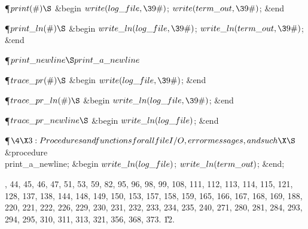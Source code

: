 \Y\P\D {}$\\{print}(\#)\S$\1\6
\&{begin} $\\{write}(\\{log\_file},\39\#)$;\5
$\\{write}(\\{term\_out},\39\#)$;\6
\&{end}\2\par
\P\D {}$\\{print\_ln}(\#)\S$\1\6
\&{begin} $\\{write\_ln}(\\{log\_file},\39\#)$;\5
$\\{write\_ln}(\\{term\_out},\39\#)$;\6
\&{end}\2\par
\P\D {}$\\{print\_newline}\S\\{print\_a\_newline}$\Y\par
\P\D {}$\\{trace\_pr}(\#)\S$\1\6
\&{begin} $\\{write}(\\{log\_file},\39\#)$;\6
\&{end}\2\par
\P\D {}$\\{trace\_pr\_ln}(\#)\S$\1\6
\&{begin} $\\{write\_ln}(\\{log\_file},\39\#)$;\6
\&{end}\2\par
\P\D {}$\\{trace\_pr\_newline}\S$\1\6
\&{begin} $\\{write\_ln}(\\{log\_file})$;\6
\&{end}\2\par
\Y\P$\4\X3:Procedures and functions for all file I/O, error messages, and such%
\X\S$\6
\4\&{procedure}\1\  \\{print\_a\_newline};\2\6
\&{begin} $\\{write\_ln}(\\{log\_file})$;\5
$\\{write\_ln}(\\{term\_out})$;\6
\&{end};\par
{}, 44, 45, 46, 47, 51, 53, 59, 82, 95, 96, 98, 99, 108, 111, 112, 113, 114,
115, 121, 128, 137, 138, 144, 148, 149, 150, 153, 157, 158, 159, 165, 166, 167,
168, 169, 188, 220, 221, 222, 226, 229, 230, 231, 232, 233, 234, 235, 240, 271,
280, 281, 284, 293, 294, 295, 310, 311, 313, 321, 356, 368, 373.
\U12.\fi

